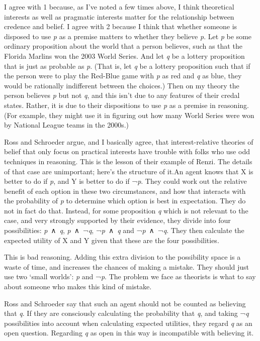 \documentclass[
  10pt,
  letterpaper,
  twoside]{scrbook}
\begin{document}
I agree with 1 because, as I've noted a few times above, I think
theoretical interests as well as pragmatic interests matter for the
relationship between credence and belief. I agree with 2 because I think
that whether someone is disposed to use \emph{p} as a premise matters to
whether they believe \emph{p}. Let \emph{p} be some ordinary proposition
about the world that a person believes, such as that the Florida Marlins
won the 2003 World Series. And let \emph{q} be a lottery proposition
that is just as probable as \emph{p}. (That is, let \emph{q} be a
lottery proposition such that if the person were to play the Red-Blue
game with \emph{p} as red and \emph{q} as blue, they would be rationally
indifferent between the choices.) Then on my theory the person believes
\emph{p} but not \emph{q}, and this isn't due to any features of their
credal states. Rather, it is due to their dispositions to use \emph{p}
as a premise in reasoning. (For example, they might use it in figuring
out how many World Series were won by National League teams in the
2000s.)

Ross and Schroeder argue, and I basically agree, that interest-relative
theories of belief that only focus on practical interests have trouble
with folks who use odd techniques in reasoning. This is the lesson of
their example of Renzi. The details of that case are unimportant; here's
the structure of it.An agent knows that X is better to do if \emph{p},
and Y is better to do if ¬\emph{p}. They could work out the relative
benefit of each option in these two circumstances, and how that
interacts with the probability of \emph{p} to determine which option is
best in expectation. They do not in fact do that. Instead, for some
proposition \emph{q} which is not relevant to the case, and very
strongly supported by their evidence, they divide into four
possibilities: \emph{p}~∧~\emph{q}, \emph{p}~∧~¬\emph{q},
¬\emph{p}~∧~\emph{q} and ¬\emph{p}~∧~¬\emph{q}. They then calculate the
expected utility of X and Y given that these are the four possibilities.

This is bad reasoning. Adding this extra division to the possibility
space is a waste of time, and increases the chances of making a mistake.
They should just use two `small worlds': \emph{p} and ¬\emph{p}. The
problem we face as theorists is what to say about someone who makes this
kind of mistake.

Ross and Schroeder say that such an agent should not be counted as
believing that \emph{q}. If they are consciously calculating the
probability that \emph{q}, and taking ¬\emph{q} possibilities into
account when calculating expected utilities, they regard \emph{q} as an
open question. Regarding \emph{q} as open in this way is incompatible
with believing it.
\end{document}

